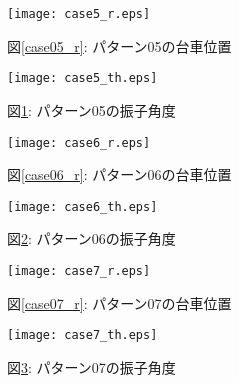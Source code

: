 \begin{figure}[htbp]
    \begin{minipage}{0.5\hsize}
        \begin{center}
            \texttt{[image: case5\_r.eps]}
            \caption{図\ref{case05_r}: パターン05の台車位置}
            \label{case05_r}
        \end{center}
    \end{minipage}
    \begin{minipage}{0.5\hsize}
        \begin{center}
            \texttt{[image: case5\_th.eps]}
            \caption{図\ref{case05_th}: パターン05の振子角度}
            \label{case05_th}
        \end{center}
    \end{minipage}
\end{figure}

\begin{figure}[htbp]
    \begin{minipage}{0.5\hsize}
        \begin{center}
            \texttt{[image: case6\_r.eps]}
            \caption{図\ref{case06_r}: パターン06の台車位置}
            \label{case06_r}
        \end{center}
    \end{minipage}
    \begin{minipage}{0.5\hsize}
        \begin{center}
            \texttt{[image: case6\_th.eps]}
            \caption{図\ref{case06_th}: パターン06の振子角度}
            \label{case06_th}
        \end{center}
    \end{minipage}
\end{figure}

\begin{figure}[htbp]
    \begin{minipage}{0.5\hsize}
        \begin{center}
            \texttt{[image: case7\_r.eps]}
            \caption{図\ref{case07_r}: パターン07の台車位置}
            \label{case07_r}
        \end{center}
    \end{minipage}
    \begin{minipage}{0.5\hsize}
        \begin{center}
            \texttt{[image: case7\_th.eps]}
            \caption{図\ref{case07_th}: パターン07の振子角度}
            \label{case07_th}
        \end{center}
    \end{minipage}
\end{figure}

